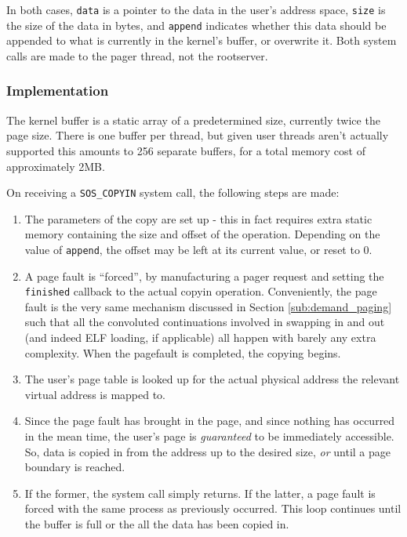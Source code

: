 \documentclass[12pt,english]{article}
\begin{document}
In both cases, \texttt{data} is a pointer to the data in the user's address space, \texttt{size} is the size of the data in bytes, and \texttt{append} indicates whether this data should be appended to what is currently in the kernel's buffer, or overwrite it.  Both system calls are made to the pager thread, not the rootserver.

\subsubsection{Implementation}

The kernel buffer is a static array of a predetermined size, currently twice the page size.  There is one buffer per thread, but given user threads aren't actually supported this amounts to 256 separate buffers, for a total memory cost of approximately 2MB.

On receiving a \texttt{SOS\_COPYIN} system call, the following steps are made:
\begin{enumerate}
\item The parameters of the copy are set up - this in fact requires extra static memory containing the size and offset of the operation.  Depending on the value of \texttt{append}, the offset may be left at its current value, or reset to 0.
\item A page fault is ``forced'', by manufacturing a pager request and setting the \texttt{finished} callback to the actual copyin operation.  Conveniently, the page fault is the very same mechanism discussed in Section \ref{sub:demand_paging} such that all the convoluted continuations involved in swapping in and out (and indeed ELF loading, if applicable) all happen with barely any extra complexity.  When the pagefault is completed, the copying begins.
\item The user's page table is looked up for the actual physical address the relevant virtual address is mapped to.
\item Since the page fault has brought in the page, and since nothing has occurred in the mean time, the user's page is \emph{guaranteed} to be immediately accessible.  So, data is copied in from the address up to the desired size, \emph{or} until a page boundary is reached.
\item If the former, the system call simply returns.  If the latter, a page fault is forced with the same process as previously occurred.  This loop continues until the buffer is full or the all the data has been copied in.
\end{enumerate}
\end{document}
